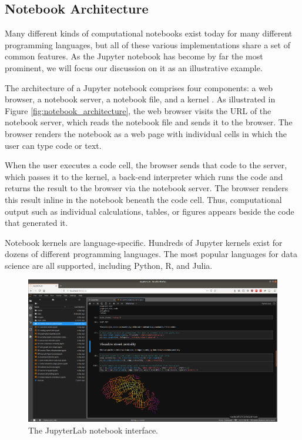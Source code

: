 \documentclass[11pt,letterpaper]{article}
\begin{document}
\subsection{Notebook Architecture}

Many different kinds of computational notebooks exist today for many different programming languages, but all of these various implementations share a set of common features. As the Jupyter notebook has become by far the most prominent, we will focus our discussion on it as an illustrative example.

The architecture of a Jupyter notebook comprises four components: a web browser, a notebook server, a notebook file, and a kernel \citep{kluyver_jupyter_2016}. As illustrated in Figure \ref{fig:notebook_architecture}, the web browser visits the URL of the notebook server, which reads the notebook file and sends it to the browser. The browser renders the notebook as a web page with individual cells in which the user can type code or text.

When the user executes a code cell, the browser sends that code to the server, which passes it to the kernel, a back-end interpreter which runs the code and returns the result to the browser via the notebook server. The browser renders this result inline in the notebook beneath the code cell. Thus, computational output such as individual calculations, tables, or figures appears beside the code that generated it.

Notebook kernels are language-specific. Hundreds of Jupyter kernels exist for dozens of different programming languages. The most popular languages for data science are all supported, including Python, R, and Julia.

\begin{figure}[tbp]
	\centering
	\includegraphics[width=1\textwidth]{jupyterlab-interface.png}
	\caption{The JupyterLab notebook interface.}
	\label{fig:jupyterlab_interface}
\end{figure}
\end{document}
